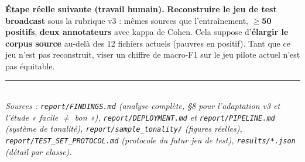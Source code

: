 \documentclass[11pt, a4paper]{article}
\begin{document}
\textbf{Étape réelle suivante (travail humain).} \textbf{Reconstruire le jeu de
test broadcast} sous la rubrique v3 : mêmes sources que l'entraînement,
\textbf{$\geq$50 positifs}, \textbf{deux annotateurs} avec kappa de Cohen. Cela
suppose d'\textbf{élargir le corpus source} au-delà des 12 fichiers actuels
(pauvres en positif). Tant que ce jeu n'est pas reconstruit, viser un chiffre
de macro-F1 sur le jeu pilote actuel n'est pas équitable.

\vspace{6pt}
\rule{\linewidth}{0.4pt}\\[3pt]
{\small\itshape Sources : \texttt{report/FINDINGS.md} (analyse complète, §8 pour
l'adaptation v3 et l'étude « facile $\neq$ bon »), \texttt{report/DEPLOYMENT.md} et
\texttt{report/PIPELINE.md} (système de tonalité), \texttt{report/sample\_tonality/}
(figures réelles), \texttt{report/TEST\_SET\_PROTOCOL.md} (protocole du futur jeu de test),
\texttt{results/*.json} (détail par classe).}
\end{document}
